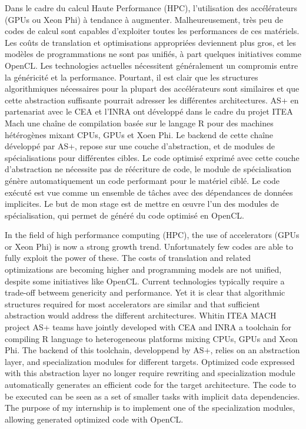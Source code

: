 \renewcommand{\abstractname}{Résumé}
\begin{abstract}
\end{abstract}
Dans le cadre du calcul Haute Performance (HPC), l'utilisation des accélérateurs
(GPUs ou Xeon Phi) à tendance à augmenter. Malheureusement, très peu de codes
de calcul sont capables d'exploiter toutes les performances de ces matériels.
Les coûts de translation et optimisations appropriées deviennent plus gros, et
les modèles de programmations ne sont pas unifiés, à part quelques initiatives
comme OpenCL. Les technologies actuelles nécessitent généralement un compromis
entre la généricité et la performance. Pourtant, il est clair que les structures
algorithmiques nécessaires pour la plupart des accélérateurs sont similaires et
que cette abstraction suffisante pourrait adresser les différentes
architectures. AS+ en partenariat avec le CEA et l'INRA ont développé dans le
cadre du projet ITEA Mach une chaîne de compilation basée sur le langage R pour
des machines hétérogènes mixant CPUs, GPUs et Xoen Phi. Le backend de cette
chaîne développé par AS+, repose sur une couche d'abstraction, et de modules de
spécialisations pour différentes cibles. Le code optimisé exprimé avec cette
couche d'abstraction ne nécessite pas de réécriture de code, le module de
spécialisation génère automatiquement un code performant pour le matériel ciblé.
Le code exécuté est vue comme un ensemble de tâches avec des dépendances de
données implicites. Le but de mon stage est de mettre en \oe{}uvre l'un des
modules de spécialisation, qui permet de généré du code optimisé en OpenCL.

\renewcommand{\abstractname}{Abstract}
\begin{abstract}
\end{abstract}
In the field of high performance computing (HPC), the use of accelerators (GPUs
or Xeon Phi) is now a strong growth trend. Unfortunately few codes are able to
fully exploit the power of these. The costs of translation and related
optimizations are becoming higher and programming models are not unified,
despite some initiatives like OpenCL. Current technologies typically require a
trade-off betweem genericity and performance. Yet it is clear that algorithmic
structures required for most accelerators are similar and that sufficient
abstraction would address the different architectures. Whitin ITEA MACH project
AS+ teams have jointly developed with CEA and INRA a toolchain for compiling R
language to heterogeneous platforms mixing CPUs, GPUs and Xeon Phi. The backend
of this toolchain, developpend by AS+, relies on an abstraction layer, and
specialization modules for different targets. Optimized code expressed with this
abstraction layer no longer require rewriting and specialization module
automatically generates an efficient code for the target architecture. The code
to be executed can be seen as a set of smaller tasks with implicit data
dependencies. The purpose of my internship is to implement one of the
specialization modules, allowing generated optimized code with OpenCL.
